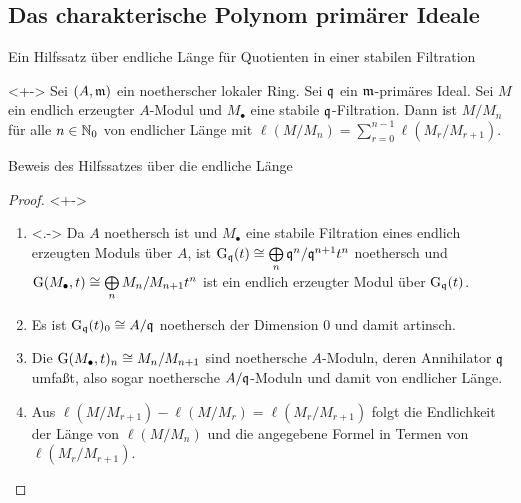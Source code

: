 \subsection{Das charakterische Polynom primärer Ideale}

\begin{frame}{Ein Hilfssatz über endliche Länge für Quotienten in einer stabilen Filtration}
	\begin{lemma}<+->
		Sei \((A, \mathfrak{m})\) ein noetherscher lokaler Ring. Sei \(\mathfrak{q}\) ein \(\mathfrak{m}\)-primäres Ideal.
		Sei \(M\) ein endlich erzeugter \(A\)-Modul und \(M_\bullet\) eine stabile \(\mathfrak{q}\)-Filtration.
		Dann ist \(M/M_n\) für alle \(n \in \mathbb N_0\) von endlicher Länge mit
		\(\ell(M/M_n) = \sum\limits_{r = 0}^{n - 1} \ell(M_r/M_{r + 1})\).
	\end{lemma}
\end{frame}

\begin{frame}{Beweis des Hilfssatzes über die endliche Länge}
	\begin{proof}<+->
		\begin{enumerate}[<+->]
		\item<.->
			Da \(A\) noethersch ist und \(M_\bullet\) eine stabile Filtration eines endlich erzeugten Moduls über \(A\),
			ist \(\operatorname{G}_{\mathfrak{q}}(t) \cong \bigoplus\limits_n \mathfrak{q}^n/\mathfrak{q}^{n + 1} t^n\) noethersch und
			\(\operatorname{G}(M_\bullet, t) \cong \bigoplus\limits_n M_n/M_{n + 1} t^n\) ist ein endlich erzeugter Modul über
			\(\operatorname{G}_{\mathfrak{q}}(t)\).
		\item
			Es ist \(\operatorname{G}_{\mathfrak{q}}(t)_0 \cong A/\mathfrak{q}\) noethersch der Dimension \(0\) und damit artinsch.
		\item
			Die \(\operatorname{G}(M_\bullet, t)_n \cong M_n/M_{n + 1}\) sind noethersche \(A\)-Moduln, deren Annihilator \(\mathfrak{q}\)
			umfaßt, also sogar noethersche \(A/\mathfrak{q}\)-Moduln und damit von endlicher Länge.
		\item
			Aus \(\ell(M/M_{r + 1}) - \ell(M/M_r) = \ell(M_r/M_{r + 1})\) folgt die Endlichkeit der Länge von
			\(\ell(M/M_n)\) und die angegebene Formel in Termen von \(\ell(M_r/M_{r + 1})\).
			\qedhere
		\end{enumerate}
	\end{proof}
\end{frame}


